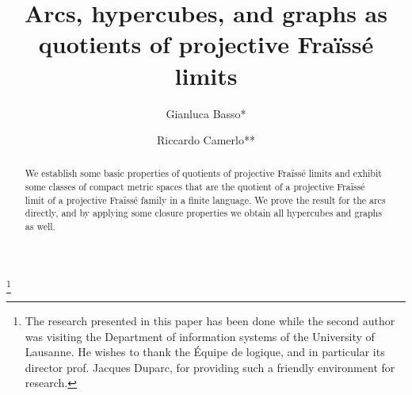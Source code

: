 \documentclass[12pt,twoside,a4paper]{amsart}
\theoremstyle{plain}
\theoremstyle{definition}
\begin{document}
\title[Quotients of projective Fra\"iss\'e limits]{Arcs, hypercubes, and graphs as quotients of projective Fra\"iss\'e limits}
\author[Gianluca Basso \and Riccardo Camerlo]{Gianluca Basso* \and Riccardo Camerlo** }

\address{\llap{*\,}D\'epartement des syst\`emes d'information{\newline\indent}
                   Universit\'e de Lausanne{\newline\indent}
                   Quartier UNIL-Dorigny B\^atiment Internef{\newline\indent}
                   1015 Lausanne{\newline\indent}
                   SWITZERLAND}

\address{\llap{**\,}Dipartimento di scienze matematiche \guillemotright{\newline\indent}
                    Politecnico di Torino{\newline\indent}
                    Corso Duca degli Abruzzi, 24{\newline\indent}
                    10129 Torino{\newline\indent}
                    ITALY}


\thanks{The research presented in this paper has been done while the second author was visiting the Department of information systems of the University of Lausanne. He wishes to thank the \'Equipe de logique, and in particular its director prof. Jacques Duparc, for providing such a friendly environment for research.}

\begin{abstract}
We establish some basic properties of quotients of projective Fra\"iss\'e limits and exhibit some classes of compact metric spaces that are the quotient of a projective Fra\"iss\'e limit of a projective Fra\"iss\'e family in a finite language.
We prove the result for the arcs directly, and by applying some closure properties we obtain all hypercubes and graphs as well.
\end{abstract}

\maketitle
\end{document}

